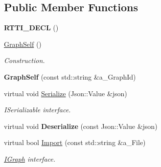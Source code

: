 \subsection*{Public Member Functions}
\begin{DoxyCompactItemize}
\item 
\mbox{\label{class_graph_self_a9117b3058bdd226c37333bf9ecf77ff9}} 
{\bfseries R\+T\+T\+I\+\_\+\+D\+E\+CL} ()
\item 
\mbox{\label{class_graph_self_af0198395a7cb48fc55b338eebb5b8661}} 
\hyperlink{class_graph_self_af0198395a7cb48fc55b338eebb5b8661}{Graph\+Self} ()
\begin{DoxyCompactList}\small\item\em Construction. \end{DoxyCompactList}\item 
\mbox{\label{class_graph_self_a4db140e964aab6f90584b9866405636f}} 
{\bfseries Graph\+Self} (const std\+::string \&a\+\_\+\+Graph\+Id)
\item 
\mbox{\label{class_graph_self_a1bdbda4234360a5745d5e290cb2697b2}} 
virtual void \hyperlink{class_graph_self_a1bdbda4234360a5745d5e290cb2697b2}{Serialize} (Json\+::\+Value \&json)
\begin{DoxyCompactList}\small\item\em I\+Serializable interface. \end{DoxyCompactList}\item 
\mbox{\label{class_graph_self_a9cc9cd31b18669d44470290dfe579972}} 
virtual void {\bfseries Deserialize} (const Json\+::\+Value \&json)
\item 
\mbox{\label{class_graph_self_ad6864c8fe4a5862e3687d041e0d4e2b1}} 
virtual bool \hyperlink{class_graph_self_ad6864c8fe4a5862e3687d041e0d4e2b1}{Import} (const std\+::string \&a\+\_\+\+File)
\begin{DoxyCompactList}\small\item\em \hyperlink{class_i_graph}{I\+Graph} interface. \end{DoxyCompactList}\item 
\mbox{\label{class_graph_self_a841bcdcd8258023be6fad40620a8d0da}} 

\end{DoxyCompactItemize}
